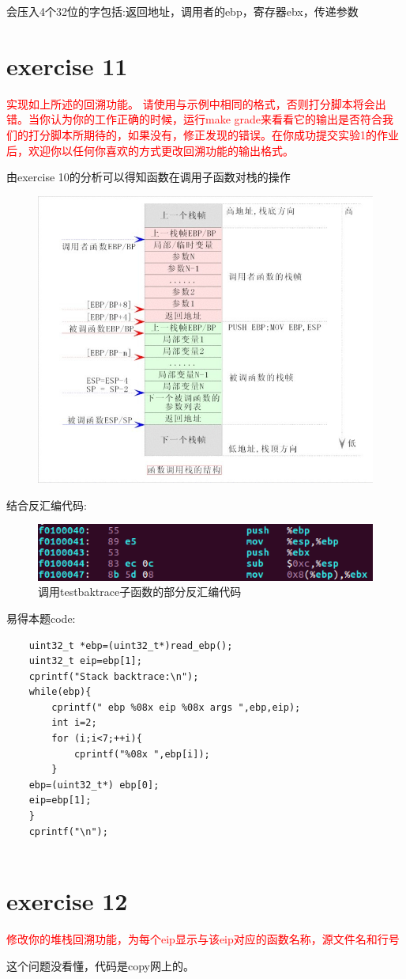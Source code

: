 \documentclass[]{ctexrep}
\begin{document}
会压入4个32位的字包括:返回地址，调用者的ebp，寄存器ebx，传递参数
	
\section{exercise 11}
\textcolor{red}{实现如上所述的回溯功能。 请使用与示例中相同的格式，否则打分脚本将会出错。当你认为你的工作正确的时候，运行make grade来看看它的输出是否符合我们的打分脚本所期待的，如果没有，修正发现的错误。在你成功提交实验1的作业后，欢迎你以任何你喜欢的方式更改回溯功能的输出格式。}

由exercise 10的分析可以得知函数在调用子函数对栈的操作\\
\begin{figure}[htpb!]
	\centering\includegraphics[scale=0.7]{figure/stack.jpg}
\end{figure}
结合反汇编代码:
\begin{figure}[htpb!]
	\centering\includegraphics[scale=0.7]{figure/backtrace}
	\caption{调用testbaktrace子函数的部分反汇编代码}
\end{figure}
易得本题code:
\begin{lstlisting}
    uint32_t *ebp=(uint32_t*)read_ebp();
    uint32_t eip=ebp[1];
    cprintf("Stack backtrace:\n");
    while(ebp){
        cprintf(" ebp %08x eip %08x args ",ebp,eip);
	    int i=2;
	    for (i;i<7;++i){
	        cprintf("%08x ",ebp[i]);
	    }
    ebp=(uint32_t*) ebp[0];
    eip=ebp[1];
	}
    cprintf("\n");
	
\end{lstlisting}

\section{exercise 12}
\textcolor{red}{修改你的堆栈回溯功能，为每个eip显示与该eip对应的函数名称，源文件名和行号}

这个问题没看懂，代码是copy网上的。
\end{document}
